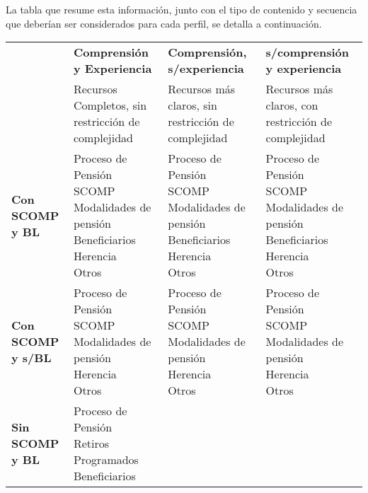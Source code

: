 La tabla que resume esta información, junto con el tipo de contenido y secuencia que deberían ser considerados para cada perfil, se detalla a continuación. 




\begin{table}[h!]
\centering
\begin{tabular}{>{\bfseries}p{1.5 cm} p{4.5cm} p{4.5cm} p{4.5cm}}
\toprule
 & \textbf{Comprensión y Experiencia} & \textbf{Comprensión, s/experiencia} & \textbf{s/comprensión y experiencia} \\
 & Recursos Completos, sin restricción de complejidad & Recursos más claros, sin restricción de complejidad & Recursos más claros, con restricción de complejidad \\
\midrule
\textbf{Con SCOMP y BL} & 
\makecell[l]{Proceso de Pensión\\SCOMP\\Modalidades de pensión\\Beneficiarios\\Herencia\\Otros} &
\makecell[l]{Proceso de Pensión\\SCOMP\\Modalidades de pensión\\Beneficiarios\\Herencia\\Otros} &
\makecell[l]{Proceso de Pensión\\SCOMP\\Modalidades de pensión\\Beneficiarios\\Herencia\\Otros} \\
\midrule
\textbf{Con SCOMP y s/BL}  &  \makecell[l]{Proceso de Pensión\\SCOMP\\Modalidades de pensión\\Herencia\\Otros} &
\makecell[l]{Proceso de Pensión\\SCOMP\\Modalidades de pensión\\Herencia\\Otros} &
\makecell[l]{Proceso de Pensión\\SCOMP\\Modalidades de pensión\\Herencia\\Otros} \\
\midrule
\textbf{Sin SCOMP y BL}    &  \makecell[l]{Proceso de Pensión\\Retiros Programados\\Beneficiarios} &

\end{tabular}
\end{table}
